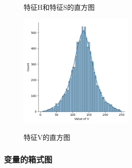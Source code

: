 \documentclass[UTF8]{ctexart}
\begin{document}
	\begin{figure}[htbp]
	\centering 
	\caption{特征H和特征S的直方图}
	\label{Fig.12}
	\end{figure}

	\begin{figure}[htbp]
	\centering
	\caption{特征V的直方图}
	\includegraphics[width=0.5\textwidth]{hist_v.png}
	\label{Fig.13}
	\end{figure}

	\subsubsection{变量的箱式图}
	
\end{document}
